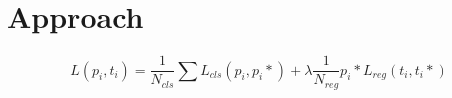 	

	





\section{Approach}
\label{sec:object_detection:approach}
	$$
	L({p_i},{t_i}) = \frac{1}{N_{cls}} \sum L_{cls}(p_i,p_i*) + \lambda \frac{1}{N_{reg}} p_i* L_{reg}(t_i,t_i*)
	$$
	
